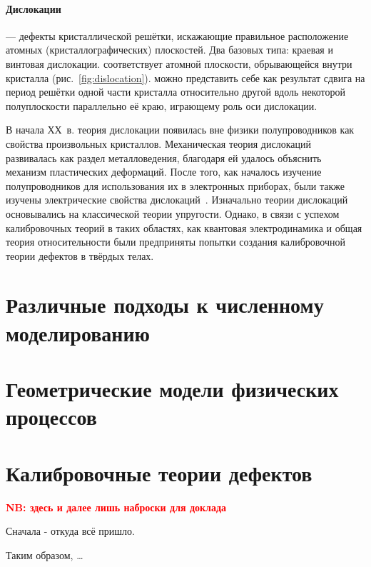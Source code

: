 \documentclass[a4paper, 14pt, titlepage]{extarticle}
\begin{document}
  \paragraph{Дислокации}--- дефекты кристаллической решётки, искажающие правильное расположение
  атомных (кристаллографических) плоскостей. Два базовых типа: краевая и винтовая дислокации.
   соответствует атомной плоскости, обрывающейся внутри кристалла (рис.~\ref{fig:dislocation}).
   можно представить себе как результат сдвига на период решётки одной
  части кристалла относительно другой вдоль некоторой полуплоскости параллельно её краю, играющему
  роль оси дислокации.


  В начала ХХ~в. теория дислокации появилась вне физики полупроводников как свойства произвольных
  кристаллов. Механическая теория дислокаций развивалась как раздел металловедения, благодаря ей
  удалось объяснить механизм пластических деформаций. После того, как началось изучение
  полупроводников для использования их в электронных приборах, были также изучены электрические
  свойства дислокаций~\cite{matare-defects}. Изначально теории дислокаций основывались на
  классической теории упругости. Однако, в связи с успехом калибровочных теорий в таких областях,
  как квантовая электродинамика и общая теория относительности были предприняты попытки создания
  калибровочной теории дефектов в твёрдых телах.

  \section{Различные подходы к численному моделированию}

  \section{Геометрические модели физических процессов}

  \section{Калибровочные теории дефектов}

  \textbf{\textcolor{red}{\large NB: здесь и далее лишь наброски для доклада}}

  Сначала - откуда всё пришло.


  Таким образом, \dots

  \PrintBibliography
\end{document}

